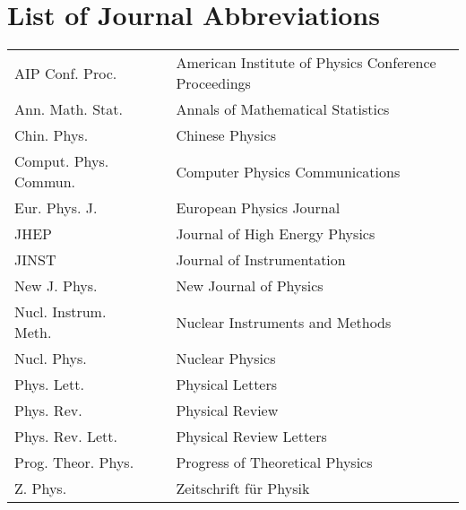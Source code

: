 
\chapter*{List of Journal Abbreviations}
\begin{center}
\begin{tabular}{lp{}p{}}
AIP Conf. Proc.      & \dotfill & American Institute of Physics Conference Proceedings\\
Ann. Math. Stat.     & \dotfill & Annals of Mathematical Statistics \\
Chin. Phys.          & \dotfill & Chinese Physics \\
Comput. Phys. Commun. & \dotfill & Computer Physics Communications \\
Eur. Phys. J.        & \dotfill & European Physics Journal \\
JHEP                 & \dotfill & Journal of High Energy Physics \\
JINST                & \dotfill & Journal of Instrumentation \\
New J. Phys.         & \dotfill & New Journal of Physics \\
Nucl. Instrum. Meth. & \dotfill & Nuclear Instruments and Methods \\
Nucl. Phys.          & \dotfill & Nuclear Physics \\ 
Phys. Lett.          & \dotfill & Physical Letters \\
Phys. Rev.           & \dotfill & Physical Review \\
Phys. Rev. Lett.     & \dotfill & Physical Review Letters \\
Prog. Theor. Phys.   & \dotfill & Progress of Theoretical Physics \\
Z. Phys.             & \dotfill & Zeitschrift f{\"u}r Physik \\
\end{tabular}
\end{center}
